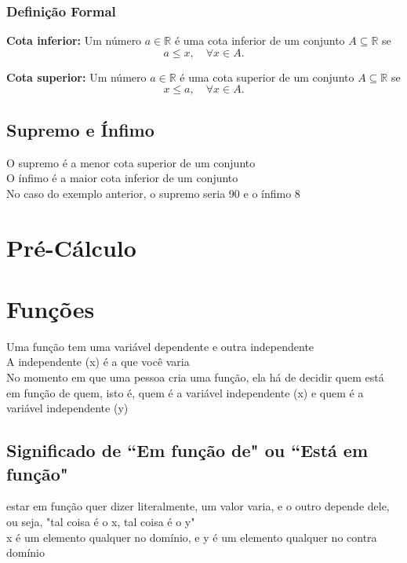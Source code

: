 \documentclass{article}
\begin{document}
\subsubsection{Definição Formal}
\textbf{Cota inferior:}
Um número $a \in \mathbb{R}$ é uma cota inferior de um conjunto $A \subseteq \mathbb{R}$ se
\[
a \leq x,\quad \forall x \in A.
\]

\textbf{Cota superior:}
Um número $a \in \mathbb{R}$ é uma cota superior de um conjunto $A \subseteq \mathbb{R}$ se
\[
x \leq a,\quad \forall x \in A.
\]

\subsection{Supremo e Ínfimo}
O supremo é a menor cota superior de um conjunto
\\[2pt]
O ínfimo é a maior cota inferior de um conjunto
\\[2pt]
No caso do exemplo anterior, o supremo seria 90 e o ínfimo 8

\section{Pré-Cálculo}

\section{Funções}
Uma função tem uma variável dependente e outra independente
\\[2pt]
A independente (x) é a que você varia 
\\[2pt]
No momento em que uma pessoa cria uma função, ela há de decidir quem está em função de quem, isto é, quem é a variável independente (x) e quem é a variável independente (y)

\subsection{Significado de ``Em função de" ou ``Está em função"}
estar em função quer dizer literalmente, um valor varia, e o outro depende dele, ou seja, "tal coisa é o x, tal coisa é o y"
\\[2pt]
x é um elemento qualquer no domínio, e y é um elemento qualquer no contra domínio
\end{document}
